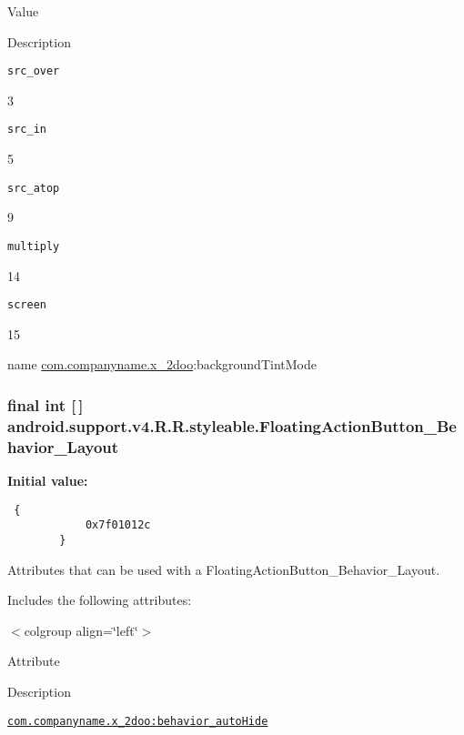 Value

Description 

{\tt src\_\-over}

3

{\tt src\_\-in}

5

{\tt src\_\-atop}

9

{\tt multiply}

14

{\tt screen}

15

name \hyperlink{namespacecom_1_1companyname_1_1x__2doo}{com.companyname.x\_\-2doo}:backgroundTintMode \hypertarget{classandroid_1_1support_1_1v4_1_1_r_1_1styleable_74fa04356d75314efc459f06cb2b13ea}{
\subsubsection[{FloatingActionButton\_\-Behavior\_\-Layout}]{\setlength{\rightskip}{0pt plus 5cm}final int \mbox{[}$\,$\mbox{]} android.support.v4.R.R.styleable.FloatingActionButton\_\-Behavior\_\-Layout}}
\label{classandroid_1_1support_1_1v4_1_1_r_1_1styleable_74fa04356d75314efc459f06cb2b13ea}


\textbf{Initial value:}

\begin{Code}\begin{verbatim} {
            0x7f01012c
        }
\end{verbatim}
\end{Code}
Attributes that can be used with a FloatingActionButton\_\-Behavior\_\-Layout. 

Includes the following attributes: \begin{TabularC}{0}
\hline
\end{TabularC}
$<$colgroup align=\char`\"{}left\char`\"{}$>$ 

Attribute

Description 

{\tt \hyperlink{classandroid_1_1support_1_1v4_1_1_r_1_1styleable_be88362aba18b70cdf8373813b961911}{com.companyname.x\_\-2doo:behavior\_\-autoHide}}

